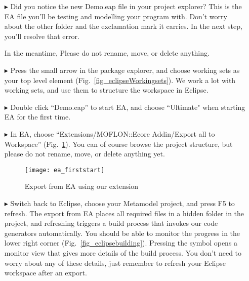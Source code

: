\newpage
\visHeader

\begin{itemize}
\FloatBarrier
\item[$\blacktriangleright$] Did you notice the new Demo.eap file in your project explorer? This is the EA file you'll be testing and modelling your program with. Don't worry about the other folder and the exclamation mark it carries. In the next step, you'll resolve that error.

In the meantime, Please do not rename, move, or delete anything.

\item[$\blacktriangleright$] Press the small arrow in the package explorer, and choose working sets as your top level element (Fig.~\ref{fig_eclipseWorkingsets}). We work a lot with working sets, and use them to structure the workspace in Eclipse.

\item[$\blacktriangleright$] Double click ``Demo.eap'' to start EA, and choose ``Ultimate" when starting EA for the first time.

\item[$\blacktriangleright$] In EA, choose ``Extensions/MOFLON::Ecore Addin/Export\- all\- to\- Workspace'' (Fig.~\ref{fig_ea}).
You can of course browse the project structure, but please do not rename, move, or delete anything yet.

\begin{figure}[htbp]
	\centering
  \texttt{[image: ea\_firststart]}
	\caption{Export from EA using our extension} 
	\label{fig_ea} 
\end{figure}
  
\item[$\blacktriangleright$] Switch back to Eclipse, choose your Metamodel project, and press F5 to refresh.
The export from EA places all required files in a hidden folder in the project, and refreshing triggers a build process that invokes our code generators automatically.
You should be able to monitor the progress in the lower right corner (Fig.~\ref{fig_eclipsebuilding}).  
Pressing the symbol opens a monitor view that gives more details of the build process. 
You don't need to worry about any of these details, just remember to refresh your Eclipse workspace after an export.
\end{itemize}